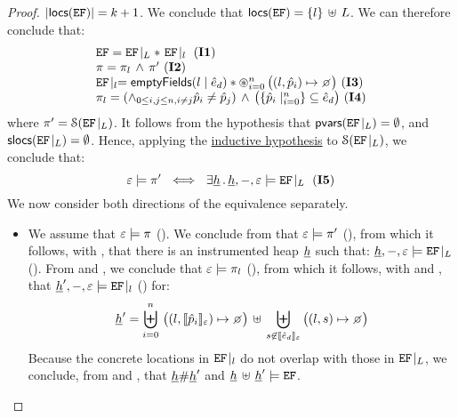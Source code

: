 \begin{proof}
\noindent{}  $\vert {\sf locs}(\mathtt{EF}) \vert = k+1$. We conclude that 
${\sf locs}(\mathtt{EF}) = \{ l \} \, \uplus \, L$. We can therefore conclude that: 
$$
\begin{array}{l}
\efs = \efproj{\efs}{L} \sep \ \efproj{\efs}{\loc} \text{ (\ieq{1})}
%
\\
%
\pc = \pc_{\loc} \, \wedge \, \pc' \text{ (\ieq{2})}
%
\\ 
%
 \efproj{\efs}{\loc} = \emptyfields{\loc}{\sexpr_d} \sep  \oast_{i = 0}^{n} \, \big((l, \sexprp_i) \mapsto \none\big) \text{ (\ieq{3})}
%
\\ 
\pc_{\loc} = (\wedge_{0 \leq i, j \leq n, i \neq j} \sexprp_i \neq \sexprp_j)
		       \, \wedge \,  \big(\{  \sexprp_i \mid_{i = 0}^n \} \subseteq \sexpr_d \big) \text{ (\ieq{4})}
\end{array}
$$
where $\pi' = {\mathcal S}(\mathtt{EF}\!\mid_{L})$. It follows from the hypothesis 
that ${\sf pvars}(\mathtt{EF}\!\mid_{L}) = \emptyset$, and ${\sf slocs}(\mathtt{EF}\!\mid_{L}) = \emptyset$.
Hence, applying the \underline{inductive hypothesis} to ${\mathcal S}(\mathtt{EF}\!\mid_{L})$, 
we conclude that: 
$$
  \senv \satisfies \pc' \ \iff \ 
       \exists \iheap \, . \, \iheap, -, \senv \satisfies \efproj{\efs}{L} \text{ (\ieq{5})}
$$
We now consider both directions of the equivalence separately. 
\begin{itemize}
	\item {} We assume that $\varepsilon \models \pi$ (). We conclude from 
	 that $\varepsilon \models \pi'$ (\ieq{7}), from which it follows, with \ieq{5},  that there is an 
	 instrumented heap $\underline{h}$ such that: $\underline{h}, -, \varepsilon \models \mathtt{EF}\!\mid_{L}$ (\ieq{8}). 
	From \ieq{6} and \ieq{2}, we conclude that  $\varepsilon \models \pi_{l}$ (\ieq{9}), from which 
	it follows, with \ieq{3} and \ieq{4}, that $\underline{h}', -, \varepsilon \models \mathtt{EF}\!\mid_{l}$ () for: 
	$$
	  \iheap' =   \biguplus_{i = 0}^{n} \, \big((l, \symbeval{\sexprp_i}{\senv}) \mapsto  \none \big) 
	       \dunion \biguplus_{\jstring \not\in \symbeval{\sexpr_d}{\senv}} \big((l, \jstring) \mapsto \none \big) 
	$$ %
	Because the concrete locations in $\mathtt{EF}\!\mid_{l}$ do 
	not overlap with those in $\mathtt{EF}\!\mid_{L}$, we conclude, from  and , that 
	$\underline{h} \# \underline{h}'$ and $\underline{h} \, \uplus \, \underline{h}' \models \mathtt{EF}$. 
	\vspace{4pt}
	

\end{itemize}
\end{proof}
